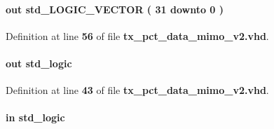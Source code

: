 \paragraph[{test\+\_\+fx3\+\_\+cnt}]{ {\bfseries \textcolor{keywordflow}{out}\textcolor{vhdlchar}{ }} {\bfseries \textcolor{comment}{std\+\_\+\+L\+O\+G\+I\+C\+\_\+\+V\+E\+C\+T\+OR}\textcolor{vhdlchar}{ }\textcolor{vhdlchar}{(}\textcolor{vhdlchar}{ }\textcolor{vhdlchar}{ } \textcolor{vhdldigit}{31} \textcolor{vhdlchar}{ }\textcolor{keywordflow}{downto}\textcolor{vhdlchar}{ }\textcolor{vhdlchar}{ } \textcolor{vhdldigit}{0} \textcolor{vhdlchar}{ }\textcolor{vhdlchar}{)}\textcolor{vhdlchar}{ }} \hspace{0.3cm}{\ttfamily [Port]}}\label{classtx__pct__data__mimo__v2_a586366f1982a56f8582269734d5e5bbb}


Definition at line {\bf 56} of file {\bf tx\+\_\+pct\+\_\+data\+\_\+mimo\+\_\+v2.\+vhd}.

\paragraph[{tst\+\_\+aclr\+\_\+ext}]{ {\bfseries \textcolor{keywordflow}{out}\textcolor{vhdlchar}{ }} {\bfseries \textcolor{comment}{std\+\_\+logic}\textcolor{vhdlchar}{ }} \hspace{0.3cm}{\ttfamily [Port]}}\label{classtx__pct__data__mimo__v2_a23b4bf10956834667bc698222eca5526}


Definition at line {\bf 43} of file {\bf tx\+\_\+pct\+\_\+data\+\_\+mimo\+\_\+v2.\+vhd}.

\paragraph[{tx\+\_\+en}]{ {\bfseries \textcolor{keywordflow}{in}\textcolor{vhdlchar}{ }} {\bfseries \textcolor{comment}{std\+\_\+logic}\textcolor{vhdlchar}{ }} \hspace{0.3cm}{\ttfamily [Port]}}\label{classtx__pct__data__mimo__v2_a844b5ac3b04ba9f57e4bcb2edcede053}


